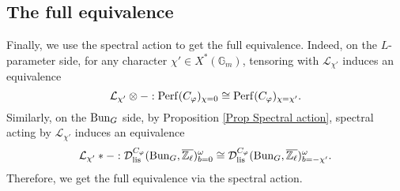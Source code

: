 








\subsection{The full equivalence}	

Finally, we use the spectral action to get the full equivalence. Indeed, on the $L$-parameter side, for any character $\chi' \in X^*(\mathbb{G}_m)$, tensoring with $\mathcal{\mathcal{L}_{\chi'}}$ induces an equivalence
$$\mathcal{\mathcal{L}_{\chi'}} \otimes -: \operatorname{\operatorname{Perf}}(C_{\varphi})_{\chi=0} \cong \operatorname{\operatorname{Perf}}(C_{\varphi})_{\chi=\chi'}.$$
Similarly, on the $\operatorname{\operatorname{Bun}}_G$ side, by Proposition \ref{Prop Spectral action}, spectral acting by $\mathcal{\mathcal{L}_{\chi'}}$ induces an equivalence
$$\mathcal{\mathcal{L}_{\chi'}}*-: \mathcal{D}_{\operatorname{\operatorname{lis}}}^{C_{\varphi}}(\operatorname{\operatorname{Bun}}_G, \overline{\mathbb{Z}_{\ell}})^{\omega}_{b=0} \cong \mathcal{D}_{\operatorname{\operatorname{lis}}}^{C_{\varphi}}(\operatorname{\operatorname{Bun}}_G, \overline{\mathbb{Z}_{\ell}})^{\omega}_{b=-\chi'}.$$ Therefore, we get the full equivalence via the spectral action.





